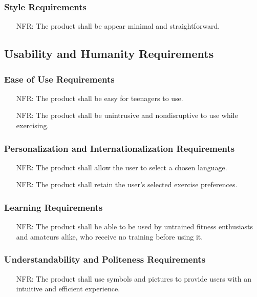 \documentclass[12pt]{article}
\newcounter{nfrnum} %
\begin{document}
\subsubsection{Style Requirements}
\noindent \begin{itemize}
	\item[NFR\refstepcounter{nfrnum}\thenfrnum:]
	The product shall be appear minimal and straightforward.
\end{itemize}
\subsection{Usability and Humanity Requirements}
\subsubsection{Ease of Use Requirements}
\noindent \begin{itemize}
	\item[NFR\refstepcounter{nfrnum}\thenfrnum:]
	The product shall be easy for teenagers to use.
	\item[NFR\refstepcounter{nfrnum}\thenfrnum:]
	The product shall be unintrusive and nondisruptive to use while exercising.
\end{itemize}
\subsubsection{Personalization and Internationalization Requirements}
\noindent \begin{itemize}
	\item[NFR\refstepcounter{nfrnum}\thenfrnum:]
	The product shall allow the user to select a chosen language.
	\item[NFR\refstepcounter{nfrnum}\thenfrnum:]
	The product shall retain the user's selected exercise preferences.
\end{itemize}
\subsubsection{Learning Requirements}
\noindent \begin{itemize}
	\item[NFR\refstepcounter{nfrnum}\thenfrnum:]
	The product shall be able to be used by untrained fitness enthusiasts and amateurs alike, who receive no training before using it.
\end{itemize}
\subsubsection{Understandability and Politeness Requirements}
\noindent \begin{itemize}
	\item[NFR\refstepcounter{nfrnum}\thenfrnum:]
	The product shall use symbols and pictures to provide users with an intuitive and efficient experience.
\end{itemize}
\end{document}

